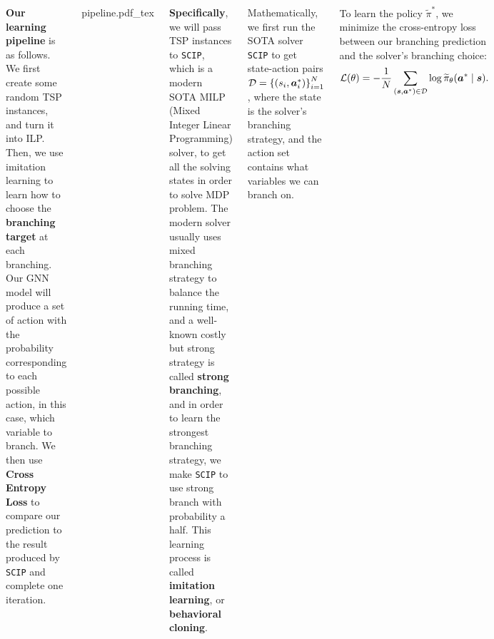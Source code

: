 \documentclass[20pt,,margin=1in,innermargin=-4.5in,blockverticalspace=-0.25in]{tikzposter}
\newcommand{\incfig}[1]{%
	\def\svgwidth{0.35\columnwidth}
	{#1.pdf_tex}
}
\begin{document}
\begin{columns}
{	\vspace{1em}
	\textbf{Our learning pipeline} is as follows. We first create some random TSP instances, and turn it into ILP.
	Then, we use imitation learning to learn how to choose the \textbf{branching target} at each branching.
	Our GNN model will produce a set of action with the probability corresponding to each possible action, in this
	case, which variable to branch. We then use \textbf{Cross Entropy Loss} to compare our prediction to the result
	produced by \texttt{SCIP} and complete one iteration.
	\begin{tikzfigure}
		\centering
		\incfig{pipeline}
	\end{tikzfigure}
	\textbf{Specifically}, we will pass TSP instances to \texttt{SCIP}, which is a modern SOTA MILP (Mixed Integer Linear Programming) solver, to get all
	the solving states in order to solve MDP problem. The modern solver usually uses mixed branching strategy to balance the running
	time, and a well-known costly but strong strategy is called \textbf{strong branching}, and in order to learn the strongest branching strategy, we make
	\texttt{SCIP} to use strong branch with probability a half. This learning process is called \textbf{imitation learning}, or \textbf{behavioral
		cloning}.

	Mathematically, we first run the SOTA solver \texttt{SCIP} to get state-action pairs \(\mathcal{\MakeUppercase{d}} = \left\{(s_{i} , \bm{a} _{i} ^\ast)\right\}_{i = 1}^N\),
	where the state is the solver's branching strategy, and the action set contains what variables we can branch on.


	To learn the policy \(\widetilde{\pi} ^\ast\), we minimize the cross-entropy loss between our branching prediction and the solver's branching choice:
	\[
		\mathcal{\MakeUppercase{l}} (\theta ) = - \frac{1}{N}\sum\limits_{(\bm{s}, \bm{a}^\ast)\in \mathcal{\MakeUppercase{d}} }\log \widetilde{\pi}_\theta (\bm{a} ^\ast \mid \bm{s} ).
	\]

}
\end{columns}
\end{document}
